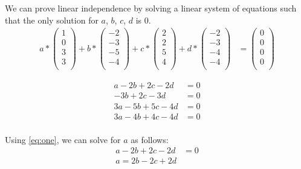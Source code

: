 \documentclass[12pt]{article}
\begin{document}
\begin{itemize}
We can prove linear independence by solving a linear system of equations such that the only solution for $a$, $b$, $c$, $d$ is 0. \\
\begin{align*}
    a * \begin{pmatrix}
    1 \\
    0 \\
    3 \\
    3 \\
    \end{pmatrix} + b * \begin{pmatrix}
    -2 \\
    -3 \\
    -5 \\
    -4 \\
    \end{pmatrix} + c * \begin{pmatrix}
    2 \\
    2 \\
    5 \\
    4 \\
    \end{pmatrix} + d * \begin{pmatrix}
    -2 \\
    -3 \\
    -4 \\
    -4 \\
    \end{pmatrix} &= \begin{pmatrix}
    0 \\
    0 \\
    0 \\
    0 \\
    \end{pmatrix}
\end{align*}

\begin{align*}
    a - 2b + 2c - 2d &= 0 \label{eq:one} \tag{1} \\
    -3b + 2c - 3d &= 0 \label{eq:two} \tag{2}\\
    3a - 5b + 5c - 4d &= 0 \label{eq:three} \tag{3} \\
    3a - 4b + 4c - 4d &= 0 \label{eq:four} \tag{4} \\
\end{align*}

Using \eqref{eq:one}, we can solve for $a$ as follows:
\begin{align*}
    a - 2b + 2c - 2d &= 0 \\
    a = 2b - 2c + 2d \\
\end{align*}


\end{itemize}
\end{document}
